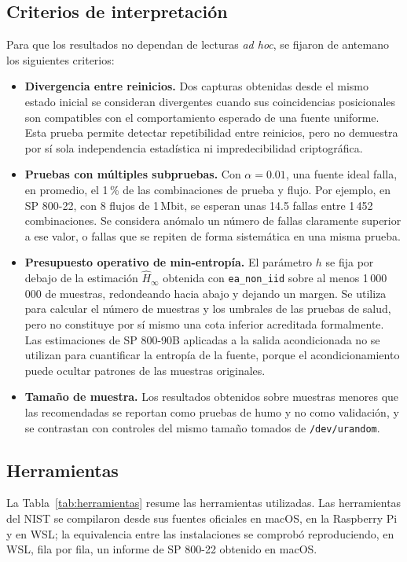 \subsection{Criterios de interpretación}

Para que los resultados no dependan de lecturas \textit{ad hoc}, se fijaron de antemano los siguientes criterios:

\begin{itemize}
    \item \textbf{Divergencia entre reinicios.} Dos capturas obtenidas desde el mismo estado inicial se consideran divergentes cuando sus coincidencias posicionales son compatibles con el comportamiento esperado de una fuente uniforme. Esta prueba permite detectar repetibilidad entre reinicios, pero no demuestra por sí sola independencia estadística ni impredecibilidad criptográfica.
    \item \textbf{Pruebas con múltiples subpruebas.} Con $\alpha = 0.01$, una fuente ideal falla, en promedio, el 1\,\% de las combinaciones de prueba y flujo. Por ejemplo, en SP 800-22, con 8 flujos de 1\,Mbit, se esperan unas 14.5 fallas entre 1\,452 combinaciones. Se considera anómalo un número de fallas claramente superior a ese valor, o fallas que se repiten de forma sistemática en una misma prueba.
    \item \textbf{Presupuesto operativo de min-entropía.} El parámetro $h$ se fija por debajo de la estimación $\hat{H}_\infty$ obtenida con \texttt{ea\_non\_iid} sobre al menos 1\,000\,000 de muestras, redondeando hacia abajo y dejando un margen. Se utiliza para calcular el número de muestras y los umbrales de las pruebas de salud, pero no constituye por sí mismo una cota inferior acreditada formalmente. Las estimaciones de SP 800-90B aplicadas a la salida acondicionada no se utilizan para cuantificar la entropía de la fuente, porque el acondicionamiento puede ocultar patrones de las muestras originales.
    \item \textbf{Tamaño de muestra.} Los resultados obtenidos sobre muestras menores que las recomendadas se reportan como pruebas de humo y no como validación, y se contrastan con controles del mismo tamaño tomados de \texttt{/dev/urandom}.
\end{itemize}

\subsection{Herramientas}

La Tabla~\ref{tab:herramientas} resume las herramientas utilizadas. Las herramientas del NIST se compilaron desde sus fuentes oficiales en macOS, en la Raspberry Pi y en WSL; la equivalencia entre las instalaciones se comprobó reproduciendo, en WSL, fila por fila, un informe de SP 800-22 obtenido en macOS.


